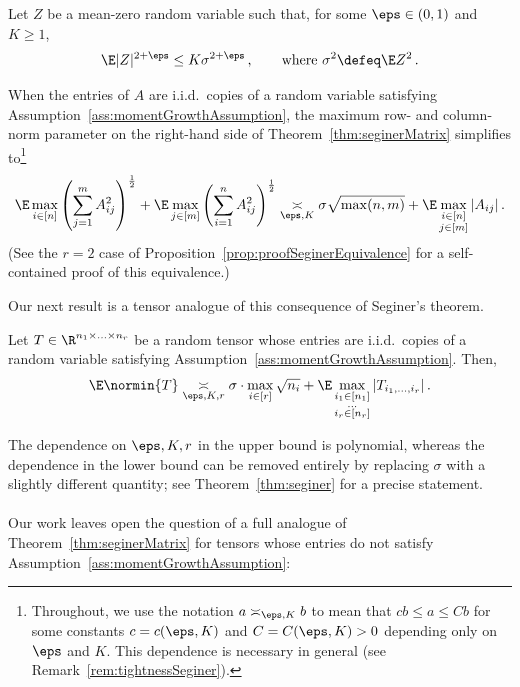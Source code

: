 \documentclass[11pt,a4paper]{article}
\begin{document}
\begin{assumption}\label{ass:momentGrowthAssumption}
    Let $Z$ be a mean-zero random variable such that, for some $\eps\in (0,1)$ and $K\ge 1$,
    \[
        \E |Z|^{2+\eps}\le K \sigma^{2+\eps}\,,\qquad \textnormal{where }\sigma^2 \defeq \E Z^2\,.
    \]
\end{assumption}
\noindent When the entries of $A$ are i.i.d.\ copies of a random variable satisfying Assumption~\ref{ass:momentGrowthAssumption}, the maximum row- and column-norm parameter
on the right-hand side of
Theorem~\ref{thm:seginerMatrix}
simplifies to\footnote{Throughout, we use the notation $a\asymp_{\eps,K} b$ to mean that $c b\le a\le C b$ for some constants $c=c(\eps,K)$ and $C=C(\eps,K)>0$ depending only
on $\eps$ and $K$. 
This dependence is necessary in general (see Remark~\ref{rem:tightnessSeginer}).}
\[
    \E \max_{i\in [n]} \left(\sum_{j=1}^m A_{ij}^2\right)^{\frac12} + \E \max_{j\in [m]} \left(\sum_{i=1}^n A_{ij}^2\right)^{\frac12}  \underset{\eps,K}\asymp \sigma \sqrt {\max(n,m)} +  \E \max_{\substack{i\in [n]\\j\in [m]}} |A_{ij}|\,.
\]
(See the $r=2$ case of Proposition~\ref{prop:proofSeginerEquivalence} for a self-contained proof of this equivalence.) 

Our next result is a
tensor analogue of this 
consequence of Seginer's theorem.

\begin{theorem}
    \label{thm:seginerIntro}
    Let $ T\in \R^{n_1\times \ldots \times n_r}$
    be a random tensor whose entries
    are i.i.d.\ copies of a random variable satisfying Assumption~\ref{ass:momentGrowthAssumption}. Then,
    \[
        \E \normin{T}\underset{\eps,K,r}\asymp \sigma \cdot \max_{i\in [r]} \sqrt{n_i} + \E \max_{\substack{i_1\in [n_1]\\\ldots\\i_r\in [n_r]}} |T_{i_1,\ldots,i_r}|\,.
    \]
\end{theorem}

\noindent The dependence on $\eps,K,r$ 
in the upper bound is polynomial, whereas the dependence in the lower bound can be removed entirely by replacing $\sigma$ with a slightly different quantity; see Theorem~\ref{thm:seginer} for
a precise statement.



\paragraph*{}Our work leaves open the question of
a full analogue of Theorem~\ref{thm:seginerMatrix}
for tensors whose entries do not
satisfy Assumption~\ref{ass:momentGrowthAssumption}:
\end{document}
